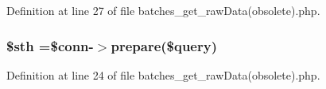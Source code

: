 Definition at line 27 of file batches\-\_\-get\-\_\-raw\-Data(obsolete).\-php.

\hypertarget{batches__get__raw_data_07obsolete_08_8php_afa9126f9664959c02795be300a135f93}{
\subsubsection[{\$sth}]{\setlength{\rightskip}{0pt plus 5cm}\$sth =\$conn-\/$>$prepare(\$query)}}\label{batches__get__raw_data_07obsolete_08_8php_afa9126f9664959c02795be300a135f93}


Definition at line 24 of file batches\-\_\-get\-\_\-raw\-Data(obsolete).\-php.

